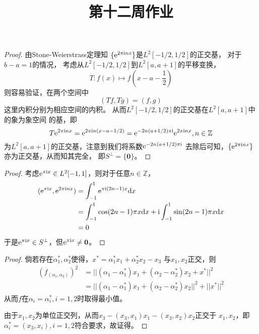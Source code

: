\documentclass[cn]{homework}
\title{第十二周作业}
\newcommand{\img}{\mathrm i}
\begin{document}
    \maketitle

    \problem
    \begin{subproblem}[(\arabic*)]
        \item
        \begin{proof}
            由Stone-Weierstrass定理知
            $\{\e^{2\pi\img nx}\}$是$L^2[-1/2,1/2]$的正交基，
            对于$b-a=1$的情况，
            考虑从$L^2[-1/2,1/2]$到$L^2[a,a+1]$的平移变换，
            \[T:f(x)\mapsto f(x-a-\frac{1}{2})\]
            则容易验证，在两个空间中
            \[(Tf,Tg)=(f,g)\]
            这里内积分别为相应空间的内积。
            从而$L^2[-1/2,1/2]$的正交基在$L^2[a,a+1]$中的象为象空间
            的基，即
            \[T\e^{2\pi\img nx}=\e^{2\pi\img n(x-a-1/2)}
            =\e^{-2n(a+1/2)\pi\img}\e^{2\pi\img nx},n\in\mathbb Z\]
            为$L^2[a,a+1]$的正交基，注意到我们将系数$\e^{-2n(a+1/2)\pi\img}$
            去除后可知，$\{\e^{2\pi\img nx}\}$亦为正交基，从而知其完全，
            即$S^\perp=\{\boldsymbol 0\}$。
        \end{proof}

        \item
        \begin{proof}
            考虑$\e^{\pi\img x}\in L^2[-1,1]$，则对于任意$n\in\mathbb Z$，
            \[\begin{aligned}
                (\e^{\pi\img x},\e^{2\pi\img nx})
                &=\int_{-1}^1\e^{\pi\img(2n-1)x}\diff x\\
                &=\int_{-1}^1\cos(2n-1)\pi x\diff x+\img\int_{-1}^1\sin(2n-1)\pi x\diff x\\
                &=0
            \end{aligned}\]
            于是$\e^{\pi\img x}\in S^\perp$，但$\e^{\pi\img x}\neq\boldsymbol 0$。
        \end{proof}
    \end{subproblem}

    \problem
    \begin{proof}
        倘若存在$\alpha_1^*,\alpha_2^*$使得，$x^*=\alpha_1^*x_1+\alpha_2^*x_2-x_3$
        与$x_1,x_2$正交，则
        \[\begin{aligned}
            (f_(\alpha_1,\alpha_2))^2
            &=||(\alpha_1-\alpha_1^*)x_1+(\alpha_2-\alpha_2^*)x_2+x^*||^2\\
            &=||(\alpha_1-\alpha_1^*)x_1+(\alpha_2-\alpha_2^*)x_2||^2
            +||x^*||^2
        \end{aligned}\]
        从而$f$在$\alpha_i=\alpha_i^*,i=1,2$时取得最小值。

        由于$x_1,x_2$为单位正交列，从而$x_3-(x_3,x_1)x_1-(x_3,x_2)x_2$正交于
        $x_1,x_2$，即$\alpha_i^*=(x_3,x_i),i=1,2$符合要求，故证得。
    \end{proof}
\end{document}
